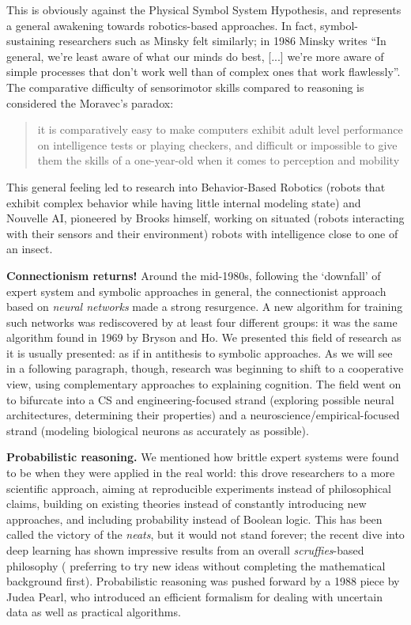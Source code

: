 \documentclass[../main.tex]{subfiles}
\begin{document}
This is obviously against the Physical Symbol System Hypothesis, and represents a general awakening towards robotics-based approaches. In fact, symbol-sustaining researchers such as Minsky felt similarly; in 1986 Minsky writes \enquote{In general, we're least aware of what our minds do best, [...] we're more aware of simple processes that don't work well than of complex ones that work flawlessly}\cite{minskySocietyMind1986}. The comparative difficulty of sensorimotor skills compared to reasoning is considered the Moravec's paradox:
\begin{quote}
    it is comparatively easy to make computers exhibit adult level performance on intelligence tests or playing checkers, and difficult or impossible to give them the skills of a one-year-old when it comes to perception and mobility
\end{quote}\cite{moravecMindChildrenFuture1988}
This general feeling led to research into Behavior-Based Robotics (robots that exhibit complex behavior while having little internal modeling state) and Nouvelle AI, pioneered by Brooks himself, working on situated (robots interacting with their sensors and their environment) robots with intelligence close to one of an insect.

\vspace{4pt}
\textbf{Connectionism returns!} Around the mid-1980s, following the `downfall' of expert system and symbolic approaches in general, the connectionist approach based on \textit{neural networks} made a strong resurgence. A new algorithm for training such networks was rediscovered by at least four different groups\cite{russellArtificialIntelligenceModern2002}: it was the same algorithm found in 1969 by Bryson and Ho. We presented this field of research as it is usually presented: as if in antithesis to symbolic approaches. As we will see in a following paragraph, though, research was beginning to shift to a cooperative view, using complementary approaches to explaining cognition. The field went on to bifurcate into a CS and engineering-focused strand (exploring possible neural architectures, determining their properties) and a neuroscience/empirical-focused strand (modeling biological neurons as accurately as possible).

\vspace{4pt}
\textbf{Probabilistic reasoning.}
We mentioned how brittle expert systems were found to be when they were applied in the real world: this drove researchers to a more scientific approach, aiming at reproducible experiments instead of philosophical claims, building on existing theories instead of constantly introducing new approaches, and including probability instead of Boolean logic. This has been called the victory of the \textit{neats}, but it would not stand forever; the recent dive into deep learning has shown impressive results from an overall \textit{scruffies}-based philosophy ( preferring to try new ideas without completing the mathematical background first). Probabilistic reasoning was pushed forward by a 1988 piece by Judea Pearl\cite{pearlProbabilisticReasoningIntelligent1988}, who introduced an efficient formalism for dealing with uncertain data as well as practical algorithms.
\end{document}
